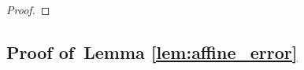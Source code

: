 \documentclass[aps,prl,reprint,twocolumn,groupedaddress,showpacs]{revtex4-1}
\def\x{{\bf x}}
\begin{document}
\begin{proof}
\end{proof}
      
\subsection{Proof of~Lemma \ref{lem:affine_error}}
\end{document}

